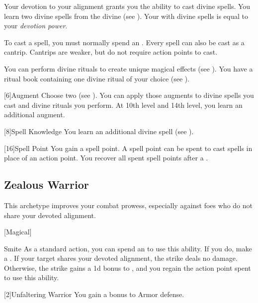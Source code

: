         Your devotion to your alignment grants you the ability to cast divine spells.
        You learn two divine spells from the divine  (see ).
        Your  with divine spells is equal to your \textit{devotion power}.

        To cast a spell, you must normally spend an .
        Every spell can also be cast as a cantrip.
        Cantrips are weaker, but do not require action points to cast.

        You can perform divine rituals to create unique magical effects (see ).
        You have a ritual book containing one divine ritual of your choice (see ).

        [6]{Augment}
        Choose two  (see ).
        You can apply those augments to divine spells you cast and divine rituals you perform.
        At 10th level and 14th level, you learn an additional augment.

        [8]{Spell Knowledge}
        You learn an additional divine spell (see ).

        [16]{Spell Point} 
        You gain a spell point.
        A spell point can be spent to cast spells in place of an action point.
        You recover all spent spell points after a .

    \subsection{Zealous Warrior}
        This archetype improves your combat prowess, especially against foes who do not share your devoted alignment.

        [Magical]
        \begin{ability}{Smite}
            As a standard action, you can spend an  to use this ability.
            If you do, make a .
            If your target shares your devoted alignment, the strike deals no damage.
            Otherwise, the strike gains a \plus1d bonus to , and you regain the action point spent to use this ability.
        \end{ability}

        [2]{Unfaltering Warrior}
        You gain a  bonus to Armor defense.

